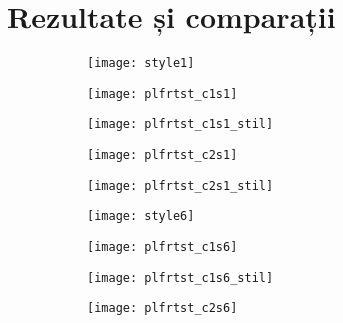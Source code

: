 \section{Rezultate și comparații}
\begin{figure}[h]
	\centering
    \begin{subfigure}[b]{0.19\textwidth}
		\centering
        \texttt{[image: style1]}
        \label{fig:anaoas_style1}
	\end{subfigure}
    \hfill
    \begin{subfigure}[b]{0.19\textwidth}
		\centering
        \texttt{[image: plfrtst\_c1s1]}
        \label{fig:plfrtst_c1s1}
	\end{subfigure}
    \hfill
    \begin{subfigure}[b]{0.19\textwidth}
		\centering
        \texttt{[image: plfrtst\_c1s1\_stil]}
        \label{fig:plfrtst_c1s1_stil}
	\end{subfigure}
    \hfill
    \begin{subfigure}[b]{0.19\textwidth}
		\centering
        \texttt{[image: plfrtst\_c2s1]}
        \label{fig:plfrtst_c2s1}
	\end{subfigure}
    \hfill
    \begin{subfigure}[b]{0.19\textwidth}
		\centering
        \texttt{[image: plfrtst\_c2s1\_stil]}
        \label{fig:plfrtst_c2s1_stil}
	\end{subfigure}
    \begin{subfigure}[b]{0.19\textwidth}
		\centering
        \texttt{[image: style6]}
        \label{fig:anaoas_style6}
	\end{subfigure}
    \hfill
    \begin{subfigure}[b]{0.19\textwidth}
		\centering
        \texttt{[image: plfrtst\_c1s6]}
        \label{fig:plfrtst_c1s6}
	\end{subfigure}
    \hfill
    \begin{subfigure}[b]{0.19\textwidth}
		\centering
        \texttt{[image: plfrtst\_c1s6\_stil]}
        \label{fig:plfrtst_c1s6_stil}
	\end{subfigure}
    \hfill
    \begin{subfigure}[b]{0.19\textwidth}
		\centering
        \texttt{[image: plfrtst\_c2s6]}
        \label{fig:plfrtst_c2s6}

\end{subfigure}
\end{figure}
